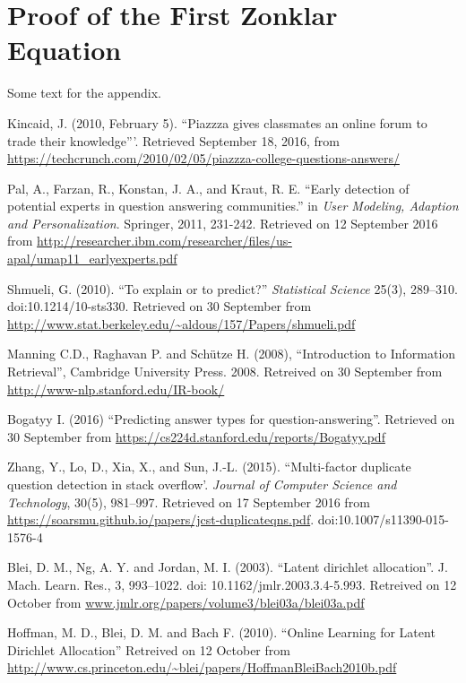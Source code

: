 \documentclass[journal,12pt,onecolumn,draftclsnofoot,]{IEEEtran}
\begin{document}
\appendices
\section{Proof of the First Zonklar Equation}
Some text for the appendix.


\begin{thebibliography}{1}

  
Kincaid, J. (2010, February 5). ``Piazzza gives classmates an online forum to trade their knowledge'''. Retrieved September 18, 2016, from \url{https://techcrunch.com/2010/02/05/piazzza-college-questions-answers/}

Pal, A., Farzan, R., Konstan, J. A., and Kraut, R. E. ``Early detection of potential experts in question answering communities.'' in \emph{User Modeling, Adaption and Personalization}. Springer, 2011, 231-242. Retrieved on 12 September 2016 from \url{http://researcher.ibm.com/researcher/files/us-apal/umap11_earlyexperts.pdf}

Shmueli, G. (2010). ``To explain or to predict?'' \emph{Statistical Science} 25(3), 289–310. doi:10.1214/10-sts330. Retrieved on 30 September from \url{http://www.stat.berkeley.edu/~aldous/157/Papers/shmueli.pdf}

Manning C.D., Raghavan P. and Schütze H. (2008), ``Introduction to Information Retrieval'', Cambridge University Press. 2008. Retreived on 30 September from \url{http://www-nlp.stanford.edu/IR-book/}

Bogatyy I. (2016) ``Predicting answer types for question-answering''. Retrieved on 30 September from \url{https://cs224d.stanford.edu/reports/Bogatyy.pdf}

Zhang, Y., Lo, D., Xia, X., and Sun, J.-L. (2015). ``Multi-factor duplicate question detection in stack overflow'. \emph{Journal of Computer Science and Technology}, 30(5), 981–997. Retrieved on 17 September 2016 from \url{https://soarsmu.github.io/papers/jcst-duplicateqns.pdf}.  doi:10.1007/s11390-015-1576-4

Blei, D. M., Ng, A. Y. and Jordan, M. I. (2003). ``Latent dirichlet allocation''. J. Mach. Learn. Res., 3, 993--1022. doi: 10.1162/jmlr.2003.3.4-5.993. Retreived on 12 October from \url{www.jmlr.org/papers/volume3/blei03a/blei03a.pdf}

Hoffman, M. D., Blei, D. M. and Bach F. (2010). ``Online Learning for Latent Dirichlet Allocation'' Retreived on 12 October from \url{http://www.cs.princeton.edu/~blei/papers/HoffmanBleiBach2010b.pdf}


\end{thebibliography}
\end{document}
